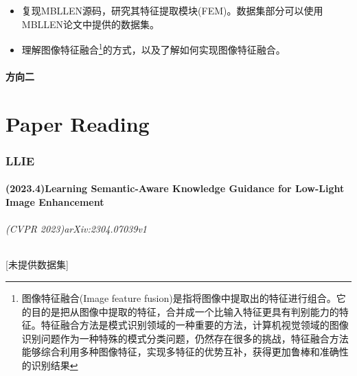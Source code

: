 \documentclass[letterpaper,10pt]{article}
\begin{document}
		\begin{itemize}
			\item[ 1)]
			复现MBLLEN源码，研究其特征提取模块(FEM)。数据集部分可以使用MBLLEN论文中提供的数据集。
			\item[ 2)]
			理解图像特征融合\footnote{图像特征融合(Image feature fusion)是指将图像中提取出的特征进行组合。它的目的是把从图像中提取的特征，合并成一个比输入特征更具有判别能力的特征。特征融合方法是模式识别领域的一种重要的方法，计算机视觉领域的图像识别问题作为一种特殊的模式分类问题，仍然存在很多的挑战，特征融合方法能够综合利用多种图像特征，实现多特征的优势互补，获得更加鲁棒和准确性的识别结果}的方式，以及了解如何实现图像特征融合。
		\end{itemize}
	
		\subsection{方向二}
	
		
	
	

	
	\part{Paper Reading}
	
	\section{LLIE}
	
		\subsection{(2023.4)Learning Semantic-Aware Knowledge Guidance for Low-Light Image Enhancement}
		\paragraph{(CVPR 2023)arXiv:2304.07039v1} [未提供数据集]
		
\end{document}
